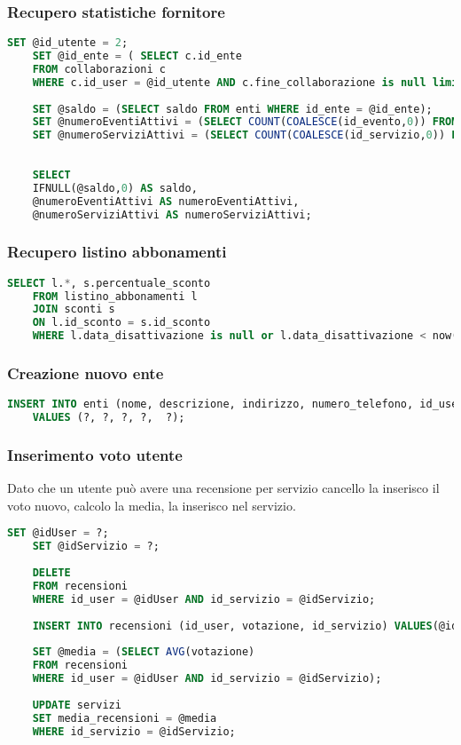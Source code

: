 \subsubsection{Recupero statistiche fornitore}
\begin{lstlisting}[language=SQL]
	SET @id_utente = 2;
	SET @id_ente = ( SELECT c.id_ente
	FROM collaborazioni c
	WHERE c.id_user = @id_utente AND c.fine_collaborazione is null limit 1);
	
	SET @saldo = (SELECT saldo FROM enti WHERE id_ente = @id_ente);
	SET @numeroEventiAttivi = (SELECT COUNT(COALESCE(id_evento,0)) FROM eventi WHERE fine_validita > now() AND id_ente = @id_ente);
	SET @numeroServiziAttivi = (SELECT COUNT(COALESCE(id_servizio,0)) FROM servizi WHERE fine_validita > now() AND id_ente = @id_ente);
	
	
	SELECT  
	IFNULL(@saldo,0) AS saldo,
	@numeroEventiAttivi AS numeroEventiAttivi,
	@numeroServiziAttivi AS numeroServiziAttivi;
\end{lstlisting}




\subsubsection{Recupero listino abbonamenti}
\begin{lstlisting}[language=SQL]
	SELECT l.*, s.percentuale_sconto
	FROM listino_abbonamenti l
	JOIN sconti s
	ON l.id_sconto = s.id_sconto
	WHERE l.data_disattivazione is null or l.data_disattivazione < now();
\end{lstlisting}


\subsubsection{Creazione nuovo ente}
\begin{lstlisting}[language=SQL]
	INSERT INTO enti (nome, descrizione, indirizzo, numero_telefono, id_user) 
	VALUES (?, ?, ?, ?,  ?);
\end{lstlisting}



\subsubsection{Inserimento voto utente}
Dato che un utente può avere una recensione per servizio cancello la inserisco il voto nuovo, calcolo la media, la inserisco nel servizio.
\begin{lstlisting}[language=SQL]
	SET @idUser = ?;
	SET @idServizio = ?;
	
	DELETE 
	FROM recensioni 
	WHERE id_user = @idUser AND id_servizio = @idServizio;
	
	INSERT INTO recensioni (id_user, votazione, id_servizio) VALUES(@idUser,?,@idServizio);
	
	SET @media = (SELECT AVG(votazione) 
	FROM recensioni 
	WHERE id_user = @idUser AND id_servizio = @idServizio);
	
	UPDATE servizi
	SET media_recensioni = @media
	WHERE id_servizio = @idServizio;
\end{lstlisting}




